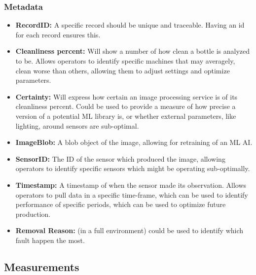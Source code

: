 \subsubsection{Metadata}

\begin{itemize}
    \item \textbf{RecordID: }A specific record should be unique and traceable. Having an id for each record ensures this.
    \item \textbf{Cleanliness percent: }Will show a number of how clean a bottle is analyzed to be. Allows operators to identify specific machines that may averagely, clean worse than others, allowing them to adjust settings and optimize parameters.
    \item \textbf{Certainty: } Will express how certain an image processing service is of its cleanliness percent. Could be used to provide a measure of how precise a version of a potential ML library is, or whether external parameters, like lighting, around sensors are sub-optimal.
    \item \textbf{ImageBlob: } A blob object of the image, allowing for retraining of an ML AI.
    \item \textbf{SensorID: } The ID of the sensor which produced the image, allowing operators to identify specific sensors which might be operating sub-optimally.
    \item \textbf{Timestamp: } A timestamp of when the sensor made its observation. Allows operators to pull data in a specific time-frame, which can be used to identify performance of specific periods, which can be used to optimize future production.
    \item \textbf{Removal Reason: } (in a full environment) could be used to identify which fault happen the most.
\end{itemize}


\subsection{Measurements}
\label{sec:measurements}
